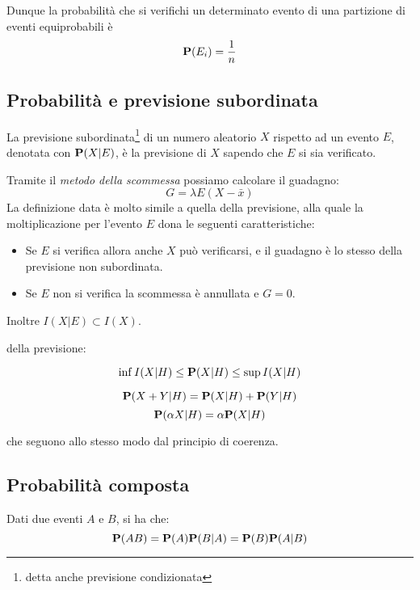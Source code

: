 Dunque la probabilità che si verifichi un determinato evento di una partizione di eventi equiprobabili è 
\[ \mathbf{P}(E_i) = \frac{1}{n} \]

\subsection{Probabilità e previsione subordinata}
\begin{definition}
  La previsione subordinata\footnote{detta anche previsione condizionata} di un numero aleatorio $X$ rispetto ad un evento $E$, denotata con \( \mathbf{P}(X|E) \), è la previsione di $X$ sapendo che $E$ si sia verificato.
\end{definition}

Tramite il \emph{metodo della scommessa} possiamo calcolare il guadagno:
\[ G = \lambda E (X - \bar{x}) \]
La definizione data è molto simile a quella della previsione, alla quale la moltiplicazione per l'evento $E$ dona le seguenti caratteristiche:
\begin{itemize}
\item Se $E$ si verifica allora anche $X$ può verificarsi, e il guadagno è lo stesso della previsione non subordinata.
\item Se $E$ non si verifica la scommessa è annullata e \( G = 0 \).
\end{itemize}

Inoltre \( I(X|E) \subset I(X) \).

 della previsione:
\begin{definition}[Monotonia]\label{pro:monotonia_previsione_subordinata}
  \[ \inf I(X|H) \le \mathbf{P}(X|H) \le \sup I(X|H) \]
\end{definition}

\begin{definition}[Linearità]\label{pro:linearita_previsione_subordinata}
  \[ \mathbf{P}(X + Y|H) = \mathbf{P}(X|H) + \mathbf{P}(Y|H) \]
  \[ \mathbf{P}(\alpha X|H) = \alpha \mathbf{P}(X|H) \]
\end{definition}

che seguono allo stesso modo dal principio di coerenza.

\subsection{Probabilità composta}
\begin{theorem}\label{thm:probabilita_composta}
  Dati due eventi $A$ e $B$, si ha che:
  \[ \mathbf{P}(AB) = \mathbf{P}(A)\mathbf{P}(B|A) = \mathbf{P}(B)\mathbf{P}(A|B) \]
\end{theorem}

